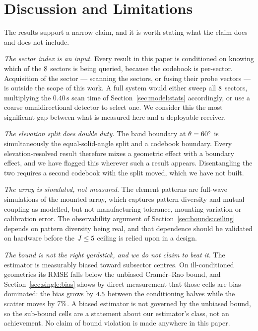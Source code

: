 \documentclass[journal]{IEEEtran}
\newcommand{\degs}{^\circ}
\begin{document}
\section{Discussion and Limitations}
\label{sec:disc}

The results support a narrow claim, and it is worth stating what the claim does
and does not include.

\emph{The sector index is an input.} Every result in this paper is conditioned
on knowing which of the $8$ sectors is being queried, because the
codebook is per-sector. Acquisition of the sector --- scanning the sectors, or
fusing their probe vectors --- is outside the scope of this work. A full system
would either sweep all $8$ sectors, multiplying the
$0.40\,\mathrm{s}$ scan time of Section~\ref{sec:model:stats} accordingly, or
use a coarse omnidirectional detector to select one. We consider this the most
significant gap between what is measured here and a deployable receiver.

\emph{The elevation split does double duty.} The band boundary at
$\theta = \elevSplit\degs$ is simultaneously the equal-solid-angle split and a
codebook boundary. Every elevation-resolved result therefore mixes a geometric
effect with a boundary effect, and we have flagged this wherever such a result
appears. Disentangling the two requires a second codebook with the split moved,
which we have not built.

\emph{The array is simulated, not measured.} The element patterns are full-wave
simulations of the mounted array, which captures pattern diversity and mutual
coupling as modelled, but not manufacturing tolerance, mounting variation or
calibration error. The observability argument of
Section~\ref{sec:bounds:ceiling} depends on pattern diversity being real, and
that dependence should be validated on hardware before the $J \le 5$
ceiling is relied upon in a design.

\emph{The bound is not the right yardstick, and we do not claim to beat it.}
The estimator is measurably biased toward subsector centres. On
ill-conditioned geometries its RMSE falls below the unbiased Cram\'er--Rao
bound, and Section~\ref{sec:single:bias} shows by direct measurement that those
cells are bias-dominated: the bias grows by $4.5$ between the
conditioning halves while the scatter moves by $7\%$. A biased
estimator is not governed by the unbiased bound, so the sub-bound cells are a
statement about our estimator's class, not an achievement. No claim of bound
violation is made anywhere in this paper.
\end{document}
